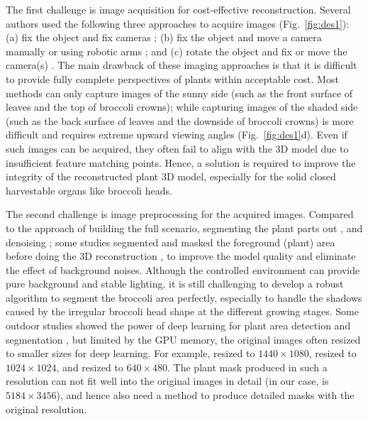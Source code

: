The first challenge is image acquisition for cost-effective reconstruction. Several authors used the following three approaches to acquire images (Fig.~\ref{fig:des1}): (a) fix the object and fix cameras \citep{nguyen_structured_2015}; (b) fix the object and move a camera manually \citep{xiao_image-based_2020} or using robotic arms \citep{cao_quantifying_2019,nguyen_3d_2016}; and (c) rotate the object and fix or move the camera(s) \citep{kochi_3d_2018,gao_novel_2021}. The main drawback of these imaging approaches is that it is difficult to provide fully complete perspectives of plants within acceptable cost. Most methods can only capture images of the sunny side (such as the front surface of leaves and the top of broccoli crowns); while capturing images of the shaded side (such as the back surface of leaves and the downside of broccoli crowns) is more difficult and requires extreme upward viewing angles (Fig.~\ref{fig:des1}d). Even if such images can be acquired, they often fail to align with the 3D model due to insufficient feature matching points. Hence, a solution is required to improve the integrity of the reconstructed plant 3D model, especially for the solid closed harvestable organs like broccoli heads.

The second challenge is image preprocessing for the acquired images. Compared to the approach of building the full scenario, segmenting the plant parts out \citep{ge_method_2019}, and denoising \citep{wu_mvs-pheno_2020}; some studies segmented and masked the foreground (plant) area before doing the 3D reconstruction \citep{nguyen_3d_2016,kochi_3d_2018}, to improve the model quality and eliminate the effect of background noises. Although the controlled environment can provide pure background and stable lighting, it is still challenging to develop a robust algorithm to segment the broccoli area perfectly, especially to handle the shadows caused by the irregular broccoli head shape at the different growing stages. Some outdoor studies showed the power of deep learning for plant area detection and segmentation \citep{zhou_monitoring_2020,blok_effect_2021,garcia_towards_2021}, but limited by the GPU memory, the original images often resized to smaller sizes for deep learning. For example, \citet{zhou_monitoring_2020} resized to $1440 \times 1080$, \citet{blok_effect_2021} resized to $1024 \times 1024$, and \citet{garcia_towards_2021} resized to $640 \times 480$. The plant mask produced in such a resolution can not fit well into the original images in detail (in our case, is $5184 \times 3456$), and hence also need a method to produce detailed masks with the original resolution.

